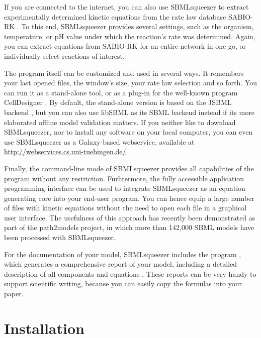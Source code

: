If you are connected to the internet, you can also use SBMLsqueezer to extract
experimentally determined kinetic equations from the rate law database SABIO-RK
\citep{Wittig2006, Rojas2007, Krebs2007, Wittig2012}.
To this end, SBMLsqueezer provides several settings, such as the organism,
temperature, or pH value under which the reaction's rate was determined. Again,
you can extract equations from SABIO-RK for an entire network in one go, or
individually select reactions of interest. 

The program itself can be customized and used in several ways. It remembers your
last opened files, the window's size, your rate law selection and so forth.
You can run it as a stand-alone tool, or as a plug-in for the well-known program
CellDesigner \citep{Funahashi2003, Funahashi2006, Funahashi2007a,
Funahashi2008}.
By default, the stand-alone version is based on the JSBML backend 
\citep{Draeger2011b}, but you can also use libSBML \citep{Bornstein2008} as its
SBML backend instead if its more elaborated offline model validation matters.
If you neither like to download SBMLsqueezer, nor to install any software on
your local computer, you can even use SBMLsqueezer as a Galaxy-based webservice,
available at \url{http://webservices.cs.uni-tuebingen.de/}. 

Finally, the command-line mode of SBMLsqueezer provides all capabilities of the
program without any restriction.
Furhtermore, the fully accessible application programming interface can be used
to integrate SBMLsqueezer as an equation generating core into your end-user
program.
You can hence equip a large number of files with kinetic equations without the
need to open each file in a graphical user interface. The usefulness of this
approach has recently been demonstrated as part of the path2models project, in
which more than 142,000 SBML models have been processed with SBMLsqueezer.

For the documentation of your model, SBMLsqueezer includes the program
\SBMLLaTeX, which generates a comprehensive report of your model, including a
detailed description of all components and equations \citep{Draeger2009b,
Draeger2010a}.
These reports can be very handy to support scientific writing, because you can
easily copy the formulas into your paper.


\chapter{Installation}

